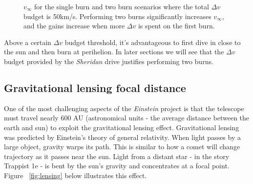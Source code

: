 \documentclass[12pt]{article} %
\begin{document}
\begin{figure}[H]
\caption{$v_{\infty}$ for the single burn and two burn scenarios where the total $\Delta v$ budget is 50km/s. Performing two burns significantly increases $v_{\infty}$, and the gains increase when more $\Delta v$ is spent on the first burn.}
\label{fig:highdv}
\end{figure}

Above a certain $\Delta v$ budget threshold, it's advantageous to first dive in close to the sun and then burn at perihelion. In later sections we will see that the $\Delta v$ budget provided by the \textit{Sheridan} drive justifies performing two burns.


\subsection{Gravitational lensing focal distance}
\label{subsec: lensing}
One of the most challenging aspects of the \textit{Einstein} project is that the telescope must travel nearly 600 AU (astronomical units - the average distance between the earth and sun) to exploit the gravitational lensing effect. Gravitational lensing was predicted by Einstein's theory of general relativity. When light passes by a large object, gravity warps its path. This is similar to how a comet will change trajectory as it passes near the sun. Light from a distant star - in the story Trappist 1e - is bent by the sun's gravity and concentrates at a focal point. Figure ~\ref{fig:lensing} below illustrates this effect.
\end{document}
